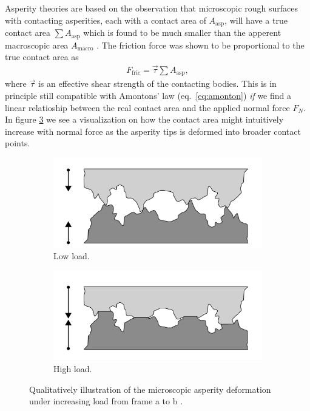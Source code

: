 Asperity theories are based on the observation that microscopic rough surfaces
with contacting asperities, each with a contact area of $A_{\text{asp}}$, will
have a true contact area $\sum A_{\text{asp}}$ which is found to be much smaller
than the apperent macroscopic area $A_{\text{macro}}$ \cite{kim_nano-scale_2009}. The friction force was shown to be proportional to the true contact area as 
\begin{align*}
  F_\text{fric} = \vec{\tau} \sum A_{\text{asp}},
\end{align*}
where $\vec{\tau}$ is an effective shear strength of the contacting bodies. This is in principle still compatible with Amontons’ law (eq.~\eqref{eq:amonton}) \textit{if} we find a linear relatioship between the real contact area and the applied normal force $F_N$. In figure \ref{fig:asperity_contact} we see a visualization on how the contact area might intuitively increase with normal force as the asperity tips is deformed into broader contact points.

\begin{figure}[H]
  \centering
  \begin{subfigure}[b]{0.49\textwidth}
      \centering
      \includegraphics[width=\textwidth]{figures/theory/asperities_top.png}
      \caption{Low load.}
      \label{fig:asp_left}
  \end{subfigure}
  \hfill
  \begin{subfigure}[b]{0.49\textwidth}
      \centering
      \includegraphics[width=\textwidth]{figures/theory/asperities_bottom.png}
      \caption{High load.}
      \label{fig:asp_right}
  \end{subfigure}
  \hfill
     \caption{Qualitatively illustration of the microscopic asperity deformation under increasing load from frame a to b \cite{wiki:asperities}.}
     \label{fig:asperity_contact}
\end{figure}


